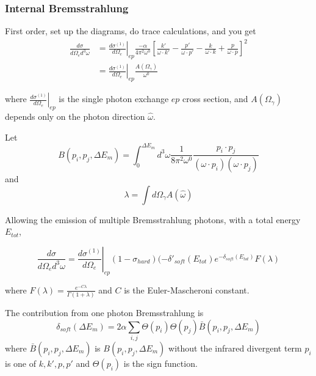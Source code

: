 \subsubsection{Internal Bremsstrahlung}
First order, set up the diagrams, do trace calculations, and you get
\begin{align}
    \frac{d\sigma}{d\Omega_e d^3\omega} &=
        \left.\frac{d \sigma^{(1)}}{d \Omega_{e}}\right|_{e p}
        \frac{-\alpha}{4 \pi^{2} \omega^{0}}
        \left[ \frac{k'}{\omega \cdot k'} -
                \frac{p'}{\omega \cdot p'} -
               \frac{k}{\omega \cdot k} +
               \frac{p}{\omega \cdot p}
        \right]^2 \\
     &= \left. \frac{d\sigma^{(1)}}{d\Omega_e}\right|_{ep}
         \frac{A(\Omega_\gamma)}{\omega^0}
\end{align}

where $\left. \frac{d\sigma^{(1)}}{d\Omega_e}\right|_{ep}$ is the single photon
exchange $ep$ cross section,
and $A(\Omega_\gamma)$ depends only on the photon direction $\hat{\omega}$.

Let
\begin{equation}
    B(p_i, p_j, \Delta E_m) = \int_0^{\Delta E_m} d^3 \omega
    \frac{1}{8\pi^2\omega^0}
    \frac{p_i \cdot p_j}{(\omega \cdot p_i)(\omega \cdot p_j)}
\end{equation}
and
\begin{equation}
    \lambda = \int d\Omega_\gamma A(\hat{\omega})
\end{equation}

Allowing the emission of multiple Bremsstrahlung photons, with a total energy
$E_{tot}$,

\begin{equation}
    \frac{d\sigma}{d\Omega_e d^3\omega} =
        \left.\frac{d \sigma^{(1)}}{d \Omega_{e}}\right|_{e p}
        (1-\sigma_{hard})
        (-\delta'_{soft}(E_{tot})
        e^{-\delta_{soft}(E_{tot})}
        F(\lambda)
\end{equation}

where $F(\lambda)=\frac{e^{-C\lambda}}{\Gamma(1+\lambda)}$ and $C$ is the
Euler-Mascheroni constant.


The contribution from one photon Bremsstrahlung is
\begin{equation}
    \delta_{soft}(\Delta E_m) = 2\alpha \sum_{i,j} \Theta(p_i) \Theta(p_j)
                                                   \bar{B}(p_i,p_j,\Delta E_m)
\end{equation}
where $\bar{B}(p_i,p_j,\Delta E_m)$ is $B(p_i,p_j,\Delta E_m)$ without the
infrared divergent term
$p_i$ is one of $k,k',p,p'$
and
$\Theta(p_i)$ is the sign function.

